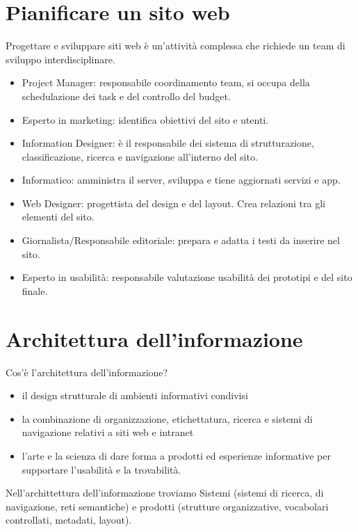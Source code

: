 \documentclass{article}
\begin{document}
\section{Pianificare un sito web}
Progettare e sviluppare siti web è un'attività complessa che richiede un team di sviluppo interdisciplinare.
\begin{itemize}
\item Project Manager: responsabile coordinamento team, si occupa della schedulazione dei task e del controllo del budget.
\item Esperto in marketing: identifica obiettivi del sito e utenti.
\item Information Designer: è il responsabile dei sistema di strutturazione, classificazione, ricerca e navigazione all'interno del sito.
\item Informatico: amministra il server, sviluppa e tiene aggiornati servizi e app.
\item Web Designer: progettista del design e del layout. Crea relazioni tra gli elementi del sito.
\item Giornalista/Responsabile editoriale: prepara e adatta i testi da inserire nel sito.
\item Esperto in usabilità: responsabile valutazione usabilità dei prototipi e del sito finale.
\end{itemize}
\section{Architettura dell'informazione}
Cos'è l'architettura dell'informazione?
\begin{itemize}
\item il design strutturale di ambienti informativi condivisi
\item la combinazione di organizzazione, etichettatura, ricerca e sistemi di navigazione relativi a siti web e intranet
\item l'arte e la scienza di dare forma a prodotti ed esperienze informative per supportare l'usabilità e la trovabilità.
\end{itemize}
Nell'archittettura dell'informazione troviamo Sistemi (sistemi di ricerca, di navigazione, reti semantiche) e prodotti (strutture organizzative, vocabolari controllati, metadati, layout).
\end{document}
